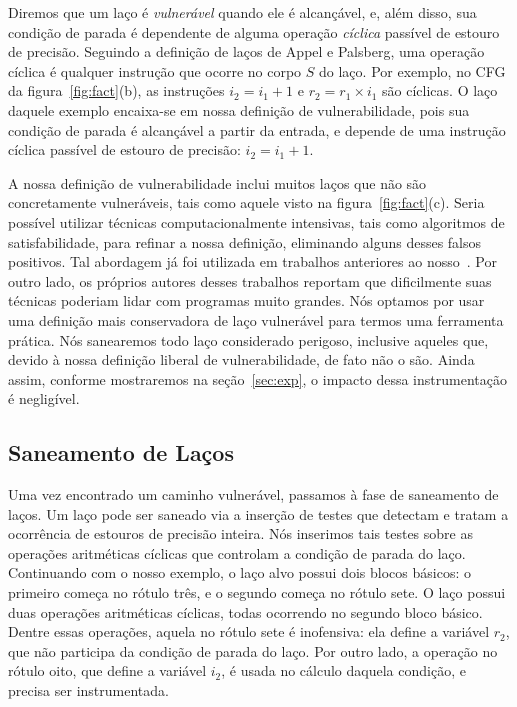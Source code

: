 \documentclass{llncs}
\begin{document}
Diremos que um laço é {\em vulnerável} quando ele é alcançável, e, além disso,
sua condição de parada é dependente de alguma operação {\em cíclica}
passível de estouro de precisão.
Seguindo a definição de laços de Appel e Palsberg, uma operação cíclica é
qualquer instrução que ocorre no corpo $S$ do laço.
Por exemplo, no CFG da figura~\ref{fig:fact}(b), as instruções
$i_2 = i_1 + 1$ e $r_2 = r_1 \times i_1$ são cíclicas.
O laço daquele exemplo encaixa-se em nossa definição de vulnerabilidade,
pois sua condição de parada é alcançável a partir da entrada, e depende de
uma instrução cíclica passível de estouro de precisão: $i_2 = i_1 + 1$.

A nossa definição de vulnerabilidade inclui muitos laços que não são
concretamente vulneráveis, tais como aquele visto na figura~\ref{fig:fact}(c).
Seria possível utilizar técnicas computacionalmente intensivas, tais como
algoritmos de satisfabilidade, para refinar a nossa definição, eliminando
alguns desses falsos positivos.
Tal abordagem já foi utilizada em trabalhos anteriores ao
nosso~\cite{Brockschmidt11,Burnim09,Gupta08,Son11,Velroyen08}.
Por outro lado, os próprios autores desses trabalhos reportam que dificilmente
suas técnicas poderiam lidar com programas muito grandes.
Nós optamos por usar uma definição mais conservadora de laço vulnerável para
termos uma ferramenta prática.
Nós sanearemos todo laço considerado perigoso, inclusive aqueles que, devido
à nossa definição liberal de vulnerabilidade, de fato não o são.
Ainda assim, conforme mostraremos na seção~\ref{sec:exp}, o impacto dessa
instrumentação é negligível.

\subsection{Saneamento de Laços}
\label{sub:san}

Uma vez encontrado um caminho vulnerável, passamos à fase de saneamento de
laços.
Um laço pode ser saneado via a inserção de testes que detectam e tratam a
ocorrência de estouros de precisão inteira.
Nós inserimos tais testes sobre as operações aritméticas cíclicas que
controlam a condição de parada do laço.
Continuando com o nosso exemplo, o laço alvo possui dois blocos básicos:
o primeiro começa no rótulo três, e o segundo começa no rótulo sete.
O laço possui duas operações aritméticas cíclicas, todas ocorrendo no segundo
bloco básico.
Dentre essas operações, aquela no rótulo sete é inofensiva: ela define a
variável $r_2$, que não participa da condição de parada do laço.
Por outro lado, a operação no rótulo oito, que define a variável $i_2$, é
usada no cálculo daquela condição, e precisa ser instrumentada.
\end{document}
